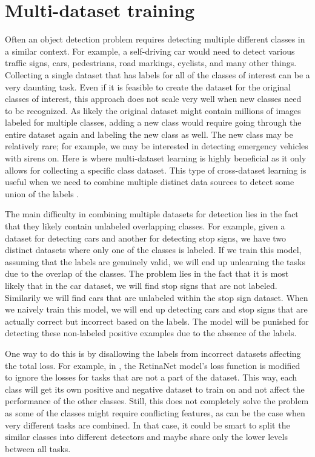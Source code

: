 \section{Multi-dataset training}
Often an object detection problem requires detecting multiple different classes in a similar context.
For example, a self-driving car would need to detect various traffic signs, cars, pedestrians, road markings, cyclists, and many other things.
Collecting a single dataset that has labels for all of the classes of interest can be a very daunting task.
Even if it is feasible to create the dataset for the original classes of interest, this approach does not scale very well when new classes need to be recognized.
As likely the original dataset might contain millions of images labeled for multiple classes, adding a new class would require going through the entire dataset again and labeling the new class as well.
The new class may be relatively rare; for example, we may be interested in detecting emergency vehicles with sirens on.
Here is where multi-dataset learning is highly beneficial as it only allows for collecting a specific class dataset.
This type of cross-dataset learning is useful when we need to combine multiple distinct data sources to detect some union of the labels \citep{cross_data}.

The main difficulty in combining multiple datasets for detection lies in the fact that they likely contain unlabeled overlapping classes.
For example, given a dataset for detecting cars and another for detecting stop signs, we have two distinct datasets where only one of the classes is labeled.
If we train this model, assuming that the labels are genuinely valid, we will end up unlearning the tasks due to the overlap of the classes.
The problem lies in the fact that it is most likely that in the car dataset, we will find stop signs that are not labeled.
Similarily we will find cars that are unlabeled within the stop sign dataset.
When we naively train this model, we will end up detecting cars and stop signs that are actually correct but incorrect based on the labels.
The model will be punished for detecting these non-labeled positive examples due to the absence of the labels.

One way to do this is by disallowing the labels from incorrect datasets affecting the total loss.
For example, in \citep{cross_data}, the RetinaNet \citep{retinaNet} model's loss function is modified to ignore the losses for tasks that are not a part of the dataset.
This way, each class will get its own positive and negative dataset to train on and not affect the performance of the other classes.
Still, this does not completely solve the problem as some of the classes might require conflicting features, as can be the case when very different tasks are combined. 
In that case, it could be smart to split the similar classes into different detectors and maybe share only the lower levels between all tasks.

